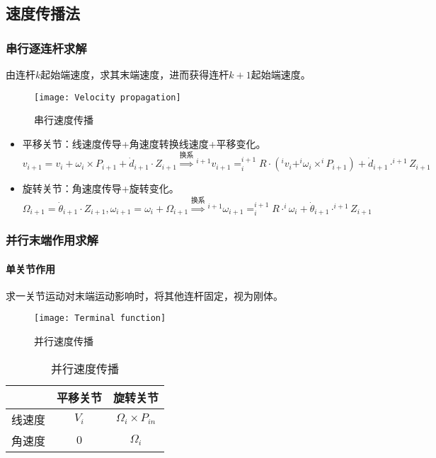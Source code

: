 \documentclass[
12pt, %
a4paper, 
oneside, %
headinclude,footinclude, %
]{scrartcl}
\begin{document}
\subsection{速度传播法}
\subsubsection{串行逐连杆求解}
由连杆$ k $起始端速度，求其末端速度，进而获得连杆$ k + 1 $起始端速度。
\begin{figure}[H]
\centering 
\texttt{[image: Velocity propagation]} 
\caption[串行速度传播]{串行速度传播}
\end{figure}

\begin{itemize}
\item 平移关节：线速度传导+角速度转换线速度+平移变化。
$$
v_{i + 1} = v_i + \omega_i \times P_{i + 1} + \dot{d}_{i + 1} \cdot Z_{i + 1}
\overset{\text{换系}}{\Longrightarrow}
{}^{i + 1}v_{i + 1} = ^{i + 1}_i R \cdot (^i v_i + ^i\omega_i \times ^i P_{i + 1}) + \dot{d}_{i + 1} \cdot ^{i + 1}Z_{i + 1}
$$
\item 旋转关节：角速度传导+旋转变化。
$$
\Omega_{i + 1} = \dot{\theta}_{i + 1} \cdot Z_{i + 1}, \omega_{i + 1} = \omega_i + \Omega_{i + 1}
\overset{\text{换系}}{\Longrightarrow}
{}^{i + 1}\omega_{i + 1} = ^{i + 1}_i R \cdot ^i\omega_i + \dot{\theta}_{i + 1} \cdot ^{i + 1}Z_{i + 1}
$$
\end{itemize} 
\subsubsection{并行末端作用求解}
\paragraph{单关节作用}\label{sec:bingxing}
求一关节运动对末端运动影响时，将其他连杆固定，视为刚体。
\begin{figure}[H]
\centering 
\texttt{[image: Terminal function]} 
\caption[并行速度传播]{并行速度传播}
\end{figure}

\begin{table}[H]
\centering
\begin{tabular}{c|cc}
\hline
& 平移关节 & 旋转关节 \\
\hline
线速度 & $ V_i $ & $ \Omega_i \times P_{in} $ \\
角速度 & $ 0 $ & $ \Omega_i $ \\
\hline
\end{tabular}
\caption{并行速度传播}
\end{table}
\end{document}
